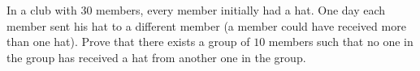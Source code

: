 In a club with $30$ members, every member initially had a hat. One day each member sent his hat to a different member (a member could have received more than one hat). Prove that there exists a group of $10$ members such that no one in the group has received a hat from another one in the group.